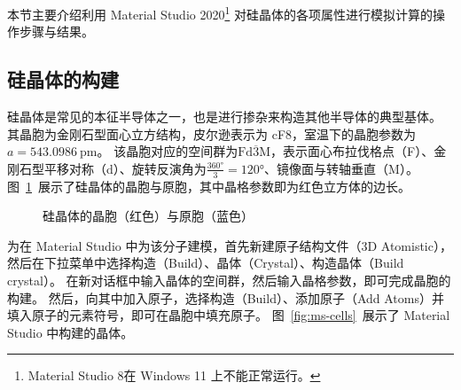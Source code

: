 
本节主要介绍利用 Material Studio 2020\footnote{Material Studio 8在 Windows 11 上不能正常运行。} 对硅晶体的各项属性进行模拟计算的操作步骤与结果。

\subsection{硅晶体的构建}

硅晶体是常见的本征半导体之一，也是进行掺杂来构造其他半导体的典型基体。
其晶胞为金刚石型面心立方结构，皮尔逊表示为 cF8，室温下的晶胞参数为$a = \qty{543.0986}{\pico\metre}$。
该晶胞对应的空间群为$\mathrm{Fd\overline{3}M}$，表示面心布拉伐格点（F）、金刚石型平移对称（d）、旋转反演角为$\frac{\ang{360}}{3}=\ang{120}$、镜像面与转轴垂直（M）。
图~\ref{fig:silicon-cell}~展示了硅晶体的晶胞与原胞，其中晶格参数即为红色立方体的边长。

\begin{figure}[ht!]
    \centering
    
    \caption{硅晶体的晶胞（红色）与原胞（蓝色）}\label{fig:silicon-cell}
\end{figure}

为在 Material Studio 中为该分子建模，首先新建原子结构文件（3D Atomistic），然后在下拉菜单中选择构造（Build）、晶体（Crystal）、构造晶体（Build crystal）。
在新对话框中输入晶体的空间群，然后输入晶格参数，即可完成晶胞的构建。
然后，向其中加入原子，选择构造（Build）、添加原子（Add Atoms）并填入原子的元素符号，即可在晶胞中填充原子。
图~\ref{fig:ms-cells}~展示了 Material Studio 中构建的晶体。

